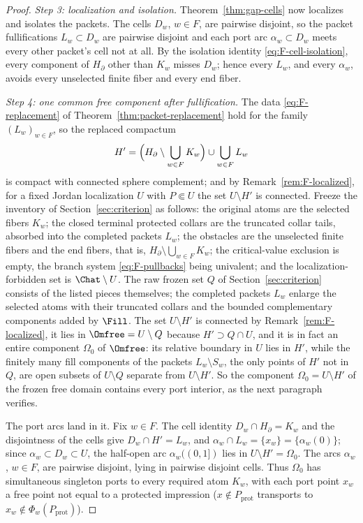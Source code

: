 \begin{proof}
\emph{Step 3: localization and isolation.}
Theorem~\ref{thm:gap-cells} now localizes and isolates the packets.  The
cells $D_w$, $w\in F$, are pairwise disjoint, so the packet
fullifications $L_w\subset D_w$ are pairwise disjoint and each port arc
$\alpha_w\subset D_w$ meets every other packet's cell not at all.  By the
isolation identity \eqref{eq:F-cell-isolation}, every component of
$H_\partial$ other than $K_w$ misses $D_w$; hence every $L_w$, and every
$\alpha_w$, avoids every unselected finite fiber and every end fiber.

\emph{Step 4: one common free component after fullification.}
The data \eqref{eq:F-replacement} of
Theorem~\ref{thm:packet-replacement} hold for the family
$(L_w)_{w\in F}$, so the replaced compactum
\[
H'=\Bigl(H_\partial\setminus\bigcup_{w\in F}K_w\Bigr)
\cup\bigcup_{w\in F}L_w
\]
is compact with connected sphere complement; and by
Remark~\ref{rem:F-localized}, for a fixed Jordan localization $U$ with
$P\Subset U$ the set $U\setminus H'$ is connected.  Freeze the
inventory of Section~\ref{sec:criterion} as follows: the original atoms
are the selected fibers $K_w$; the closed terminal protected collars are
the truncated collar tails, absorbed into the completed packets $L_w$;
the obstacles are the unselected finite fibers and the end fibers, that
is, $H_\partial\setminus\bigcup_{w\in F}K_w$; the critical-value
exclusion is empty, the branch system \eqref{eq:F-pullbacks} being
univalent; and the localization-forbidden set is $\Chat\setminus U$.
The raw frozen set $Q$ of Section~\ref{sec:criterion} consists of the
listed pieces themselves; the completed packets $L_w$ enlarge the
selected atoms with their truncated collars and the bounded
complementary components added by $\Fill$.  The set $U\setminus H'$ is
connected by Remark~\ref{rem:F-localized}, it lies in
$\Omfree=U\setminus Q$ because $H'\supset Q\cap U$, and it is in fact an
entire component $\Omega_0$ of $\Omfree$: its relative boundary in $U$
lies in $H'$, while the finitely many fill components of the packets
$L_w\setminus S_w$, the only points of $H'$ not in $Q$, are open subsets
of $U\setminus Q$ separate from $U\setminus H'$.  So the component
$\Omega_0=U\setminus H'$ of the frozen free domain contains every port
interior, as the next paragraph verifies.

The port arcs land in it.  Fix $w\in F$.  The cell identity
$D_w\cap H_\partial=K_w$ and the disjointness of the cells give
$D_w\cap H'=L_w$, and $\alpha_w\cap L_w=\{x_w\}=\{\alpha_w(0)\}$; since
$\alpha_w\subset D_w\subset U$, the half-open arc
$\alpha_w((0,1])$ lies in $U\setminus H'=\Omega_0$.  The arcs
$\alpha_w$, $w\in F$, are pairwise disjoint, lying in pairwise disjoint
cells.  Thus $\Omega_0$ has simultaneous singleton ports to every
required atom $K_w$, with each port point $x_w$ a free point not equal
to a protected impression
($x\notin P_{\mathrm{prot}}$ transports to
$x_w\notin\Phi_w(P_{\mathrm{prot}})$).


\end{proof}
